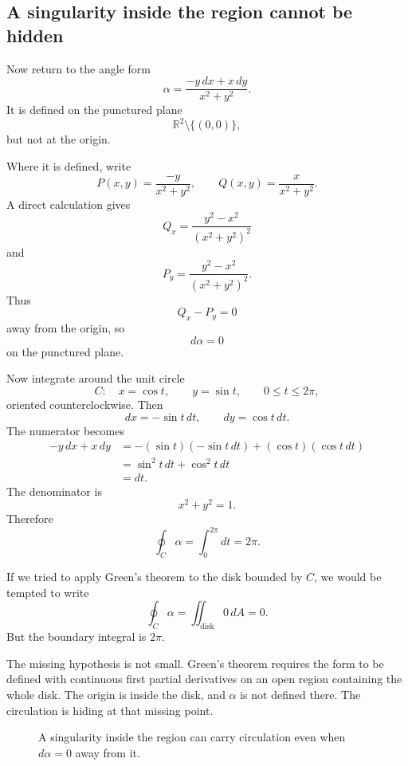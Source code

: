 \subsection{A singularity inside the region cannot be hidden}

Now return to the angle form
\[
    \alpha=\frac{-y\,dx+x\,dy}{x^2+y^2}.
\]
It is defined on the punctured plane
\[
    \mathbb R^2\setminus\{(0,0)\},
\]
but not at the origin.

Where it is defined, write
\[
    P(x,y)=\frac{-y}{x^2+y^2},
    \qquad
    Q(x,y)=\frac{x}{x^2+y^2}.
\]
A direct calculation gives
\[
    Q_x=
    \frac{y^2-x^2}{(x^2+y^2)^2}
\]
and
\[
    P_y=
    \frac{y^2-x^2}{(x^2+y^2)^2}.
\]
Thus
\[
    Q_x-P_y=0
\]
away from the origin, so
\[
    d\alpha=0
\]
on the punctured plane.

Now integrate around the unit circle
\[
    C:\quad x=\cos t,\qquad y=\sin t,\qquad 0\le t\le2\pi,
\]
oriented counterclockwise.  Then
\[
    dx=-\sin t\,dt,
    \qquad
    dy=\cos t\,dt.
\]
The numerator becomes
\[
\begin{aligned}
    -y\,dx+x\,dy
    &=
    -(\sin t)(-\sin t\,dt)+(\cos t)(\cos t\,dt)\\
    &=
    \sin^2t\,dt+\cos^2t\,dt\\
    &=
    dt.
\end{aligned}
\]
The denominator is
\[
    x^2+y^2=1.
\]
Therefore
\[
\boxed{
    \oint_C\alpha
    =
    \int_0^{2\pi}dt
    =
    2\pi.
}
\]

If we tried to apply Green's theorem to the disk bounded by \(C\), we would be tempted
to write
\[
    \oint_C\alpha
    =
    \iint_{\text{disk}}0\,dA
    =
    0.
\]
But the boundary integral is \(2\pi\).

The missing hypothesis is not small.  Green's theorem requires the form to be defined
with continuous first partial derivatives on an open region containing the whole disk.
The origin is inside the disk, and \(\alpha\) is not defined there.  The circulation is
hiding at that missing point.

\begin{figure}[h]
\centering
{}
\caption{A singularity inside the region can carry circulation even when \(d\alpha=0\)
away from it.}
\end{figure}

